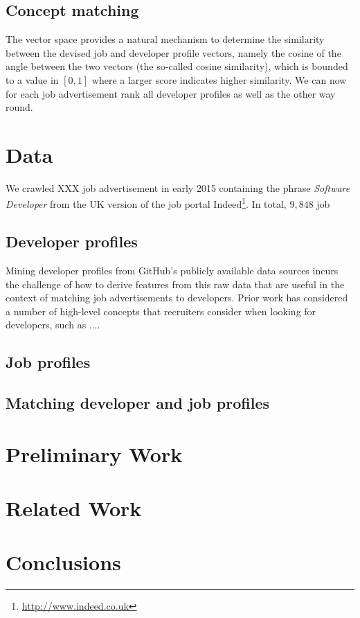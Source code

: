 \documentclass[conference]{IEEEtran}
\begin{document}
\subsection{Concept matching}

The vector space provides a natural mechanism to determine the similarity
between the devised job and developer profile vectors, namely the cosine of the
angle between the two vectors (the so-called cosine similarity), which is
bounded to a value in $[0,1]$ where a larger score indicates higher similarity.
We can now for each job advertisement rank all developer profiles as well as the
other way round.

\section{Data}


We crawled XXX job advertisement in early 2015 containing the phrase \emph{Software Developer} from the UK version of the job portal Indeed\footnote{\url{http://www.indeed.co.uk}}. In total, $9,848$ job 


\subsection{Developer profiles}

Mining developer profiles from GitHub's publicly available data sources incurs
the challenge of how to derive features from this raw data that are useful in
the context of matching job advertisements to developers. Prior work has
considered a number of high-level concepts that recruiters consider when looking
for developers, such as ....

\subsection{Job profiles}

\subsection{Matching developer and job profiles}


\section{Preliminary Work}

\section{Related Work}

\section{Conclusions}



\end{document}
